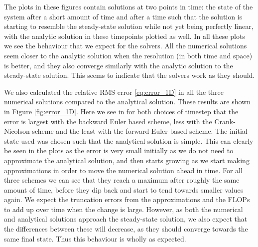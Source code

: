 \documentclass[reprint,english,notitlepage]{revtex4-1}  %
\begin{document}
The plots in these figures contain solutions at two points in time: the state of the system after a short amount of time and after a time such that the solution is starting to resemble the steady-state solution while not yet being perfectly linear, with the analytic solution in these timepoints plotted as well. In all these plots we see the behaviour that we expect for the solvers. All the numerical solutions seem closer to the analytic solution when the resolution (in both time and space) is better, and they also converge similarly with the analytic solution to the steady-state solution. This seems to indicate that the solvers work as they should. 

We also calculated the relative RMS error \eqref{eq:error_1D} in all the three numerical solutions compared to the analytical solution. These results are shown in Figure \ref{fig:error_1D}. Here we see in for both choices of timestep that the error is largest with the backward Euler based scheme, less with the Crank-Nicolson scheme and the least with the forward Euler based scheme. The initial state used was chosen such that the analytical solution is simple. This can clearly be seen in the plots as the error is very small initially as we do not need to approximate the analytical solution, and then starts growing as we start making approximations in order to move the numerical solution ahead in time. For all three schemes we can see that they reach a maximum after roughly the same amount of time, before they dip back and start to tend towards smaller values again. We expect the truncation errors from the approximations and the FLOPs to add up over time when the change is large. However, as both the numerical and analytical solutions approach the steady-state solution, we also expect that the differences between these will decrease, as they should converge towards the same final state. Thus this behaviour is wholly as expected. 
\end{document}
